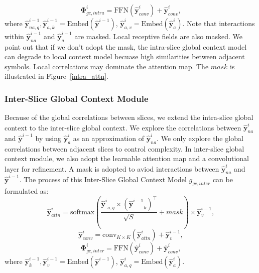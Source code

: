 \documentclass[sigconf]{acmart}
\begin{document}
\begin{equation}
    {\boldsymbol{\Phi}}^i_{gc,intra} = \textrm{FFN}(\hat {\boldsymbol{y}}^{i}_{conv}) + \hat {\boldsymbol{y}}^{i}_{conv},
\end{equation}
where $\hat {\boldsymbol{y}}^{i-1}_{na,q}, \hat {\boldsymbol{y}}^{i-1}_{a,k} = \textrm{Embed}(\hat {\boldsymbol{y}}^{i-1})$, $\hat {\boldsymbol{y}}^{i}_{a,v} = \textrm{Embed}(\hat {\boldsymbol{y}}^i_{a})$.
Note that interactions within $\hat {\boldsymbol{y}}^{i-1}_{na}$ and $\hat {\boldsymbol{y}}^{i-1}_a$
are masked. Local receptive fields are also masked.
We point out that if we don't adopt the mask, the intra-slice global context model
can degrade to local context model becuase high similarities between adjacent symbols.
Local correlations may dominate the attention map.
The $mask$ is illustrated in Figure~\ref{intra_attn}.
\subsubsection{Inter-Slice Global Context Module}
Because of the global correlations between slices,
we extend the intra-slice global context to the inter-slice global context.
We explore the correlations between $\hat {\boldsymbol{y}}^{i}_{na}$ and $\hat {\boldsymbol{y}}^{i-1}$
by using $\hat {\boldsymbol{y}}^{i}_a$ as an approximation of $\hat {\boldsymbol{y}}^{i}_{na}$.
We only explore the global correlations between adjacent slices to control complexity.
In inter-slice global context module, we also adopt
the learnable attention map and a convolutional layer for refinement.
A mask is adopted to aviod interactions between $\hat {\boldsymbol{y}}^{i}_{na}$ and $\hat {\boldsymbol{y}}^{i-1}$.
The process of this Inter-Slice Global Context Model $g_{gc, inter}$ can be formulated as:
\begin{equation}
  \hat {\boldsymbol{y}}^{i}_{attn} = \textrm{softmax}\left(\frac{{{\hat {\boldsymbol{y}}}^{i}}_{a,q} \times ({{\hat {\boldsymbol{y}}}^{i-1}}_{k})^\top}{\sqrt{S}} + mask\right) \times \hat {\boldsymbol{y}}^{i-1}_{v},
\end{equation}
\begin{equation}
  \hat {\boldsymbol{y}}^{i}_{conv} = \textrm{conv}_{K\times K}(\hat {\boldsymbol{y}}^{i}_{attn}) + \hat {\boldsymbol{y}}^{i-1}_{v},
\end{equation}
\begin{equation}
  {\boldsymbol{\Phi}}^i_{gc,inter} = \textrm{FFN}(\hat {\boldsymbol{y}}^{i}_{conv}) + \hat {\boldsymbol{y}}^{i}_{conv},
\end{equation}
where $\hat {\boldsymbol{y}}^{i-1}_{k}, \hat {\boldsymbol{y}}^{i-1}_{v} = \textrm{Embed}(\hat {\boldsymbol{y}}^{i-1})$, $\hat {\boldsymbol{y}}^{i}_{a,q} = \textrm{Embed}(\hat {\boldsymbol{y}}^i_{a})$.
\end{document}
